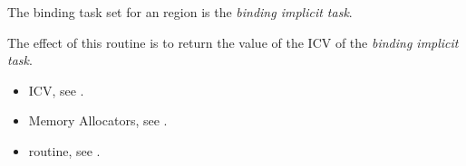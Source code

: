 \binding

The binding task set for an  region is the \emph{binding implicit task}.

\effect

The effect of this routine is to return the value of the  ICV of the \emph{binding implicit task}.

\crossreferences
\begin{itemize}
\item {} ICV, see .
\item Memory Allocators, see .
\item {} routine, see .
\end{itemize}


